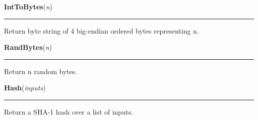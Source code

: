     \vspace{0.5ex}

\hspace{.8\funcindent}\begin{boxedminipage}{\funcwidth}

    \raggedright \textbf{IntToBytes}(\textit{n})

    \vspace{-1.5ex}

    \rule{\textwidth}{0.5\fboxrule}
\setlength{\parskip}{2ex}
    Return byte string of 4 big-endian ordered bytes representing n.

\setlength{\parskip}{1ex}
    \end{boxedminipage}

    \label{keyczar:util:RandBytes}

    \vspace{0.5ex}

\hspace{.8\funcindent}\begin{boxedminipage}{\funcwidth}

    \raggedright \textbf{RandBytes}(\textit{n})

    \vspace{-1.5ex}

    \rule{\textwidth}{0.5\fboxrule}
\setlength{\parskip}{2ex}
    Return n random bytes.

\setlength{\parskip}{1ex}
    \end{boxedminipage}

    \label{keyczar:util:Hash}

    \vspace{0.5ex}

\hspace{.8\funcindent}\begin{boxedminipage}{\funcwidth}

    \raggedright \textbf{Hash}(\textit{inputs})

    \vspace{-1.5ex}

    \rule{\textwidth}{0.5\fboxrule}
\setlength{\parskip}{2ex}
    Return a SHA-1 hash over a list of inputs.

\setlength{\parskip}{1ex}
    \end{boxedminipage}

